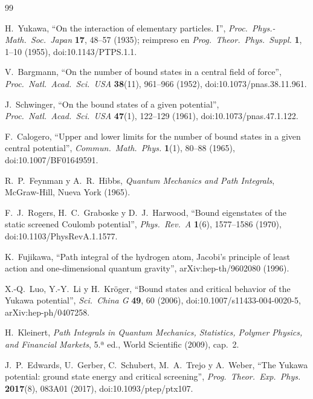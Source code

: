 \documentclass[11pt]{article}
\begin{document}
\begin{thebibliography}{99}

 H.~Yukawa, ``On the interaction of elementary particles. I'', \emph{Proc.\ Phys.-Math.\ Soc.\ Japan} \textbf{17}, 48--57 (1935); reimpreso en \emph{Prog.\ Theor.\ Phys.\ Suppl.} \textbf{1}, 1--10 (1955), doi:10.1143/PTPS.1.1.

 V.~Bargmann, ``On the number of bound states in a central field of force'', \emph{Proc.\ Natl.\ Acad.\ Sci.\ USA} \textbf{38}(11), 961--966 (1952), doi:10.1073/pnas.38.11.961.

 J.~Schwinger, ``On the bound states of a given potential'', \emph{Proc.\ Natl.\ Acad.\ Sci.\ USA} \textbf{47}(1), 122--129 (1961), doi:10.1073/pnas.47.1.122.

 F.~Calogero, ``Upper and lower limits for the number of bound states in a given central potential'', \emph{Commun.\ Math.\ Phys.} \textbf{1}(1), 80--88 (1965), doi:10.1007/BF01649591.

 R.~P.~Feynman y A.~R.~Hibbs, \emph{Quantum Mechanics and Path Integrals}, McGraw-Hill, Nueva York (1965).

 F.~J.~Rogers, H.~C.~Graboske y D.~J.~Harwood, ``Bound eigenstates of the static screened Coulomb potential'', \emph{Phys.\ Rev.\ A} \textbf{1}(6), 1577--1586 (1970), doi:10.1103/PhysRevA.1.1577.

 K.~Fujikawa, ``Path integral of the hydrogen atom, Jacobi's principle of least action and one-dimensional quantum gravity'', arXiv:hep-th/9602080 (1996).

 X.-Q.~Luo, Y.-Y.~Li y H.~Kröger, ``Bound states and critical behavior of the Yukawa potential'', \emph{Sci.\ China G} \textbf{49}, 60 (2006), doi:10.1007/s11433-004-0020-5, arXiv:hep-ph/0407258.

 H.~Kleinert, \emph{Path Integrals in Quantum Mechanics, Statistics, Polymer Physics, and Financial Markets}, 5.ª ed., World Scientific (2009), cap.~2.

 J.~P.~Edwards, U.~Gerber, C.~Schubert, M.~A.~Trejo y A.~Weber, ``The Yukawa potential: ground state energy and critical screening'', \emph{Prog.\ Theor.\ Exp.\ Phys.} \textbf{2017}(8), 083A01 (2017), doi:10.1093/ptep/ptx107.


\end{thebibliography}
\end{document}
